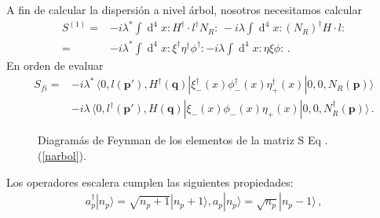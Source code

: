  A fin de calcular la dispersión a nivel árbol, nosotros necesitamos calcular
\begin{align}
  S^{(1)}=&-i \lambda^*\int \operatorname{d}^4 x : H^{\dagger} \cdot  l^{\dagger} N_R  : \,
  -i \lambda\int \operatorname{d}^4 x :\left(N_R\right)^\dagger   H\cdot  l : \nonumber\\
       =&-i \lambda^*\int \operatorname{d}^4 x :\xi^{\dagger} \eta^{\dagger}  \phi^{\dagger} :
       -i \lambda\int \operatorname{d}^4 x :\eta\xi  \phi:\,.
\end{align}
En orden de evaluar
\begin{align}
\label{narbol}
  S_{fi}=&-i\lambda^*\,\langle 0,l(\boldsymbol{p'}) , H^\dagger(\boldsymbol{q}) | \xi_{-}^{\dagger}(x)   \phi_-^{\dagger}(x)\eta^{\dagger}_+(x) | 0,0, N_R(\boldsymbol{p})\rangle \nonumber\\
  &-i\lambda\,\langle 0,l^\dagger(\boldsymbol{p'}) , H(\boldsymbol{q})| \xi_{-}(x)   \phi_- (x)\eta_+(x) | 0,0, N_R^\dagger(\boldsymbol{p})\rangle\,.
\end{align}
\begin{figure}[H]
  \centering
  \caption{Diagramás de Feynman de los elementos de la matriz S Eq . (\ref{narbol}).}
\end{figure}
Los operadores escalera cumplen las siguientes propiedades:
\begin{align}
a_p^{\dagger}|n_p\rangle=\sqrt{n_p+1}|n_p+1\rangle ,   a_p|n_p\rangle=\sqrt{n_p}|n_p-1\rangle\,,
\end{align}

